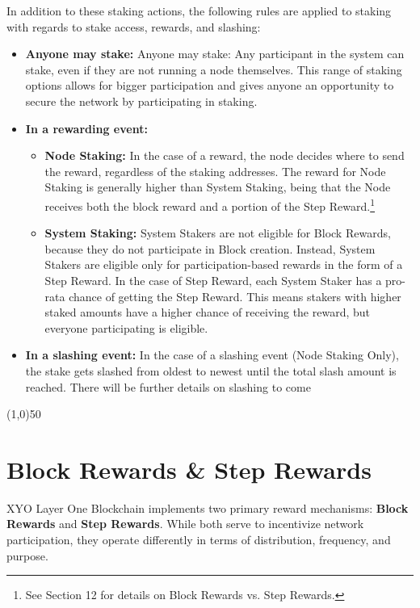 \documentclass{article}
\begin{document}
In addition to these staking actions, the following rules are applied to staking with regards to stake access, rewards, and slashing:

\begin{itemize}
    \item \textbf{Anyone may stake:} Anyone may stake: Any participant in the system can stake, even if they are not running a node themselves. This range of staking options allows for bigger participation and gives anyone an opportunity to secure the network by participating in staking. 
    \item \textbf{In a rewarding event:} \begin{itemize}
        \item \textbf{Node Staking:} In the case of a reward, the node decides where to send the reward, regardless of the staking addresses. The reward for Node Staking is generally higher than System Staking, being that the Node receives both the block reward and a portion of the Step Reward.\footnote{ See Section 12 for details on Block Rewards vs. Step Rewards.}
        \item \textbf{System Staking:} System Stakers are not eligible for Block Rewards, because they do not participate in Block creation. Instead, System Stakers are eligible only for participation-based rewards in the form of a Step Reward. In the case of Step Reward, each System Staker has a pro-rata chance of getting the Step Reward. This means stakers with higher staked amounts have a higher chance of receiving the reward, but everyone participating is eligible.

    \end{itemize}
    \item \textbf{In a slashing event:} In the case of a slashing event (Node Staking Only), the stake gets slashed from oldest to newest until the total slash amount is reached. There will be further details on slashing to come
 \end{itemize}

\begin{center}
\line(1,0){50}
\end{center}

\section{Block Rewards \& Step Rewards}

XYO Layer One Blockchain implements two primary reward mechanisms:
\textbf{Block Rewards} and \textbf{Step Rewards}. While both serve to
incentivize network participation, they operate differently in terms of
distribution, frequency, and purpose.
\end{document}
